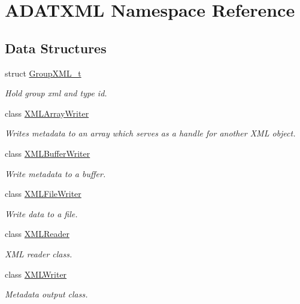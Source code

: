 \hypertarget{namespaceADATXML}{}\section{A\+D\+A\+T\+X\+ML Namespace Reference}
\label{namespaceADATXML}
\subsection*{Data Structures}
\begin{DoxyCompactItemize}
\item 
struct \mbox{\hyperlink{structADATXML_1_1GroupXML__t}{Group\+X\+M\+L\+\_\+t}}
\begin{DoxyCompactList}\small\item\em Hold group xml and type id. \end{DoxyCompactList}\item 
class \mbox{\hyperlink{classADATXML_1_1XMLArrayWriter}{X\+M\+L\+Array\+Writer}}
\begin{DoxyCompactList}\small\item\em Writes metadata to an array which serves as a handle for another X\+ML object. \end{DoxyCompactList}\item 
class \mbox{\hyperlink{classADATXML_1_1XMLBufferWriter}{X\+M\+L\+Buffer\+Writer}}
\begin{DoxyCompactList}\small\item\em Write metadata to a buffer. \end{DoxyCompactList}\item 
class \mbox{\hyperlink{classADATXML_1_1XMLFileWriter}{X\+M\+L\+File\+Writer}}
\begin{DoxyCompactList}\small\item\em Write data to a file. \end{DoxyCompactList}\item 
class \mbox{\hyperlink{classADATXML_1_1XMLReader}{X\+M\+L\+Reader}}
\begin{DoxyCompactList}\small\item\em X\+ML reader class. \end{DoxyCompactList}\item 
class \mbox{\hyperlink{classADATXML_1_1XMLWriter}{X\+M\+L\+Writer}}
\begin{DoxyCompactList}\small\item\em Metadata output class. \end{DoxyCompactList}\end{DoxyCompactItemize}
